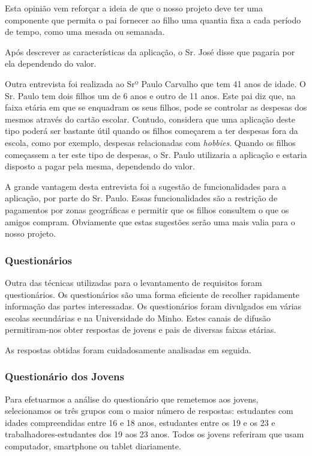 \documentclass[12pt,a4paper]{article}
\begin{document}
      Esta opinião vem reforçar a ideia de que o nosso projeto deve ter uma componente que permita o pai fornecer ao filho uma quantia fixa a cada período de tempo, como uma mesada ou semanada.

      Após descrever as características da aplicação, o Sr. José disse que pagaria por ela dependendo do valor.

      Outra entrevista foi realizada ao Srº Paulo Carvalho que tem 41 anos de idade. O Sr. Paulo tem dois filhos um de 6 anos e outro de 11 anos. Este pai diz que, na faixa etária em que se enquadram os seus filhos, pode se controlar as despesas dos mesmos através do cartão escolar. Contudo, considera que uma aplicação deste tipo poderá ser bastante útil quando os filhos começarem a ter despesas fora da escola, como por exemplo, despesas relacionadas com \emph{hobbies}. Quando os filhos começassem a ter este tipo de despesas, o Sr. Paulo utilizaria a aplicação e estaria disposto a pagar pela mesma, dependendo do valor.

      A grande vantagem desta entrevista foi a sugestão de funcionalidades para a aplicação, por parte do Sr. Paulo. Essas funcionalidades são a restrição de pagamentos por zonas geográficas e permitir que os filhos consultem o que os amigos compram. Obviamente que estas sugestões serão uma mais valia para o nosso projeto.

    \subsubsection{Questionários}
      Outra das técnicas utilizadas para o levantamento de requisitos foram questionários. Os questionários são uma forma eficiente de recolher rapidamente informação das partes interessadas. Os questionários foram divulgados em várias escolas secundárias e na Universidade do Minho. Estes canais de difusão permitiram-nos obter respostas de jovens e pais de diversas faixas etárias.

      As respostas obtidas foram cuidadosamente analisadas em seguida.

    \subsubsection{Questionário dos Jovens}

      Para efetuarmos a análise do questionário que remetemos aos jovens, selecionamos os três grupos com o maior número de respostas: estudantes com idades compreendidas entre 16 e 18 anos, estudantes entre os 19 e os 23 e trabalhadores-estudantes dos 19 aos 23 anos. Todos os jovens referiram que usam computador, smartphone ou tablet diariamente.
\end{document}
